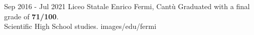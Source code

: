 \sepspace
{}
{Sep 2016 - Jul 2021}
{Liceo Statale Enrico Fermi, Cantù}
{Graduated with a final grade of \textbf{71/100}.\\
Scientific High School studies.}
{images/edu/fermi}
